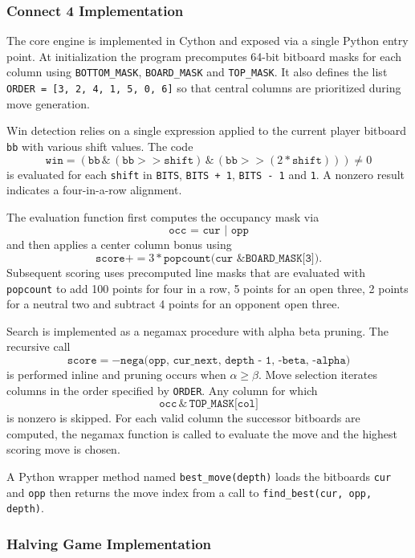 \documentclass[12pt]{article}
\begin{document}
\subsubsection{Connect 4 Implementation}

The core engine is implemented in Cython and exposed via a single Python entry point. At initialization the program precomputes 64-bit \gls{bitboard} masks for each column using \texttt{BOTTOM\_MASK}, \texttt{BOARD\_MASK} and \texttt{TOP\_MASK}. It also defines the list \texttt{ORDER = [3, 2, 4, 1, 5, 0, 6]} so that central columns are prioritized during move generation.

Win detection relies on a single expression applied to the current player bitboard \texttt{bb} with various shift values. The code
\[
\texttt{win} = (\texttt{bb} \,\&\, (\texttt{bb} >> \texttt{shift}) \,\&\, (\texttt{bb} >> (2 * \texttt{shift}))) \neq 0
\]
is evaluated for each \texttt{shift} in \texttt{BITS}, \texttt{BITS + 1}, \texttt{BITS - 1} and \texttt{1}. A nonzero result indicates a four-in-a-row alignment.

The evaluation function first computes the occupancy mask via
\[
\texttt{occ = cur | opp}
\]
and then applies a center column bonus using
\[
\texttt{score} += 3 * \texttt{popcount(cur \& BOARD\_MASK[3])}.
\]
Subsequent scoring uses precomputed line masks that are evaluated with \texttt{popcount} to add 100 points for four in a row, 5 points for an open three, 2 points for a neutral two and subtract 4 points for an opponent open three.

\noindent Search is implemented as a negamax procedure with alpha beta pruning. The recursive call
\[
\texttt{score} = -\texttt{nega(opp, cur\_next, depth - 1, -beta, -alpha)}
\]
is performed inline and pruning occurs when \(\alpha \ge \beta\). Move selection iterates columns in the order specified by \texttt{ORDER}. Any column for which
\[
\texttt{occ} \,\&\, \texttt{TOP\_MASK[col]}
\]
is nonzero is skipped. For each valid column the successor bitboards are computed, the negamax function is called to evaluate the move and the highest scoring move is chosen.

A Python wrapper method named \texttt{best\_move(depth)} loads the bitboards \texttt{cur} and \texttt{opp} then returns the move index from a call to \texttt{find\_best(cur, opp, depth)}.

\subsubsection{Halving Game Implementation}
\end{document}
